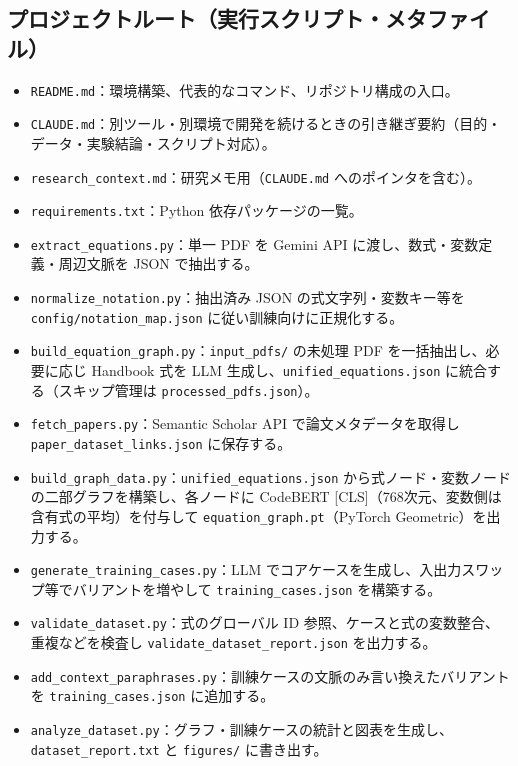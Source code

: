 \documentclass[11pt,a4paper]{jsarticle}
\begin{document}
\subsection{プロジェクトルート（実行スクリプト・メタファイル）}
\begin{itemize}[nosep]
  \item \texttt{README.md}：環境構築、代表的なコマンド、リポジトリ構成の入口。
  \item \texttt{CLAUDE.md}：別ツール・別環境で開発を続けるときの引き継ぎ要約（目的・データ・実験結論・スクリプト対応）。
  \item \texttt{research\_context.md}：研究メモ用（\texttt{CLAUDE.md} へのポインタを含む）。
  \item \texttt{requirements.txt}：Python 依存パッケージの一覧。
  \item \texttt{extract\_equations.py}：単一 PDF を Gemini API に渡し、数式・変数定義・周辺文脈を JSON で抽出する。
  \item \texttt{normalize\_notation.py}：抽出済み JSON の式文字列・変数キー等を \texttt{config/notation\_map.json} に従い訓練向けに正規化する。
  \item \texttt{build\_equation\_graph.py}：\texttt{input\_pdfs/} の未処理 PDF を一括抽出し、必要に応じ Handbook 式を LLM 生成し、\texttt{unified\_equations.json} に統合する（スキップ管理は \texttt{processed\_pdfs.json}）。
  \item \texttt{fetch\_papers.py}：Semantic Scholar API で論文メタデータを取得し \texttt{paper\_dataset\_links.json} に保存する。
  \item \texttt{build\_graph\_data.py}：\texttt{unified\_equations.json} から式ノード・変数ノードの二部グラフを構築し、各ノードに CodeBERT [CLS]（768次元、変数側は含有式の平均）を付与して \texttt{equation\_graph.pt}（PyTorch Geometric）を出力する。
  \item \texttt{generate\_training\_cases.py}：LLM でコアケースを生成し、入出力スワップ等でバリアントを増やして \texttt{training\_cases.json} を構築する。
  \item \texttt{validate\_dataset.py}：式のグローバル ID 参照、ケースと式の変数整合、重複などを検査し \texttt{validate\_dataset\_report.json} を出力する。
  \item \texttt{add\_context\_paraphrases.py}：訓練ケースの文脈のみ言い換えたバリアントを \texttt{training\_cases.json} に追加する。
  \item \texttt{analyze\_dataset.py}：グラフ・訓練ケースの統計と図表を生成し、\texttt{dataset\_report.txt} と \texttt{figures/} に書き出す。

\end{itemize}
\end{document}
